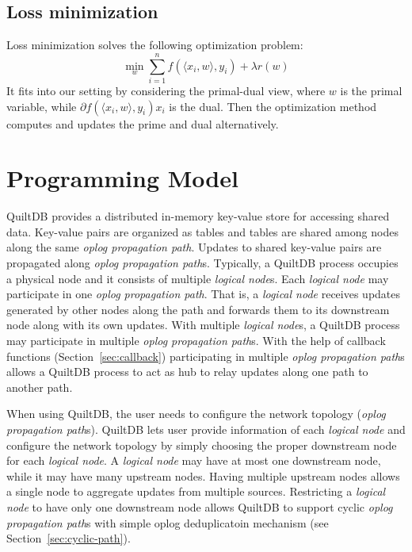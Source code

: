 \documentclass{acm_proc_article-sp}
\begin{document}
\subsection{Loss minimization}

Loss minimization solves the following optimization problem:
\begin{equation}
  \min_w \sum_{i=1}^{n} f(\langle x_i, w\rangle, y_i) + \lambda r(w)
\end{equation}
It fits into our setting by considering the primal-dual view, where $w$ is the primal
variable, while $\partial f(\langle x_i, w\rangle, y_i) x_i$ is the dual. Then
the optimization method computes and updates the prime and dual alternatively.

\section{Programming Model}

QuiltDB provides a distributed in-memory key-value store for accessing shared 
data. Key-value pairs are organized as tables and tables are shared among 
nodes along the same \emph{oplog propagation path}. Updates to shared key-value 
pairs are propagated along \emph{oplog propagation path}s. Typically, a QuiltDB 
process occupies a physical node and it
consists of multiple \emph{logical node}s. Each \emph{logical node} may 
participate in one \emph{oplog propagation path}. That is, a \emph{logical node}
receives updates generated by other nodes along the path and forwards them to 
its downstream node along with its own updates. With multiple \emph{logical 
node}s, a QuiltDB process may participate in multiple \emph{oplog propagation 
path}s. With the help of callback functions (Section~\ref{sec:callback}) 
participating in multiple \emph{oplog propagation path}s
allows a QuiltDB process to act as hub to relay updates along one path to 
another path.

When using QuiltDB, the user needs to configure the network topology 
(\emph{oplog propagation path}s). QuiltDB lets user provide information of 
each \emph{logical node} and configure the network topology by simply choosing 
the proper downstream node for each \emph{logical node}. A \emph{logical node} 
may have at most one downstream node, while it may have many upstream nodes. 
Having multiple upstream nodes allows a single node to aggregate updates from 
multiple sources. Restricting a \emph{logical node} to have only one downstream 
node allows QuiltDB to support cyclic \emph{oplog propagation path}s with simple 
oplog deduplicatoin mechanism (see Section~\ref{sec:cyclic-path}).
\end{document}
